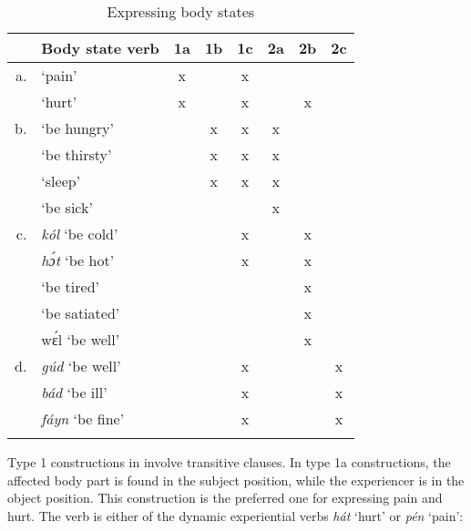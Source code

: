 \begin{table}
\caption{Expressing body states}
\label{tab:key:9.11}

\begin{tabularx}{\textwidth}{rl CCC CCC}
\lsptoprule

& Body state verb & 1a & 1b & 1c & 2a & 2b & 2c\\
\midrule
a. &  ‘pain’ & x &  & x &  &  & \\
&  ‘hurt’ & x &  & x &  & x & \\

\tablevspace
b. &  ‘be hungry’ &  & x & x & x &  & \\
&  ‘be thirsty’ &  & x & x & x &  & \\
& \textit{} ‘sleep’ &  & x & x & x &  & \\
&  ‘be sick’ &  &  &  & x &  & \\

\tablevspace
c. & \textit{kól} ‘be cold’ &  &  & x &  & x & \\
& \textit{hɔ́t} ‘be hot’ &  &  & x &  & x & \\
&  ‘be tired’ &  &  &  &  & x & \\
&  ‘be satiated’ &  &  &  &  & x & \\
& wɛ́l ‘be well’ &  &  &  &  & x & \\

\tablevspace
d. & \textit{gúd} ‘be well’ &  &  & x &  &  & x\\
& \textit{bád} ‘be ill’ &  &  & x &  &  & x\\
& \textit{fáyn} ‘be fine’ &  &  & x &  &  & x\\
\lspbottomrule
\end{tabularx}
\end{table}
Type 1 constructions in  involve transitive clauses. In type 1a constructions, the affected body part\is{} is found in the subject position, while the experiencer is in the object position. This construction is the preferred one for expressing pain and hurt. The verb is either of the dynamic experiential verbs \textit{hát} ‘hurt’ or \textit{pén} ‘pain’:



